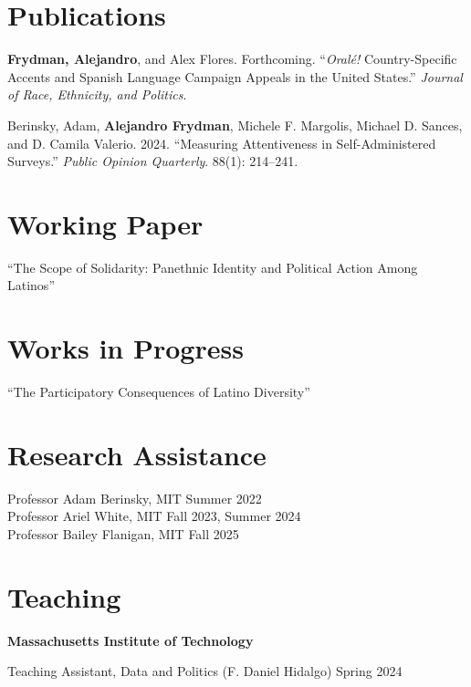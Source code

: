 \documentclass[margin,line]{res}
\newenvironment{list1}{
  \begin{list}{\ding{113}}{%
      \setlength{\itemsep}{0in}
      \setlength{\parsep}{0in} \setlength{\parskip}{0in}
      \setlength{\topsep}{0in} \setlength{\partopsep}{0in}
      \setlength{\leftmargin}{0.17in}}}{\end{list}}
\begin{document}
\begin{resume}
\section{\sc Publications}
\begin{etaremune}
  \setlength\itemindent{-1em}
  \setlength{}
  \item \textbf{Frydman, Alejandro}, and Alex Flores. Forthcoming. ``\textit{Oralé!} Country-Specific Accents and Spanish Language Campaign Appeals in the United States.'' \textit{Journal of Race, Ethnicity, and Politics}.
  \item Berinsky, Adam, \textbf{Alejandro Frydman}, Michele F. Margolis, Michael D. Sances, and D. Camila Valerio. 2024. ``Measuring Attentiveness in Self-Administered Surveys.'' \textit{Public Opinion Quarterly}. 88(1): 214--241.
\end{etaremune}

\section{\sc Working Paper}
\begin{list1}
  \setlength\itemindent{-1em}
  \setlength{}
  \item[] ``The Scope of Solidarity: Panethnic Identity and Political Action Among Latinos''
\end{list1}

\section{\sc Works in Progress}
\begin{list1}
  \item[] ``The Participatory Consequences of Latino Diversity''
  \vspace*{.05in}
\end{list1}

\section{\sc Research Assistance}
Professor Adam Berinsky, MIT  \hfill {Summer 2022} \\
Professor Ariel White, MIT \hfill {Fall 2023, Summer 2024} \\
Professor Bailey Flanigan, MIT \hfill {Fall 2025} \\

\section{\sc Teaching}
{\bf Massachusetts Institute of Technology}\\
\vspace*{-.15in}
\begin{list1}
  \item[] Teaching Assistant, Data and Politics (F. Daniel Hidalgo) \hfill {Spring 2024}
\end{list1}


\end{resume}
\end{document}
